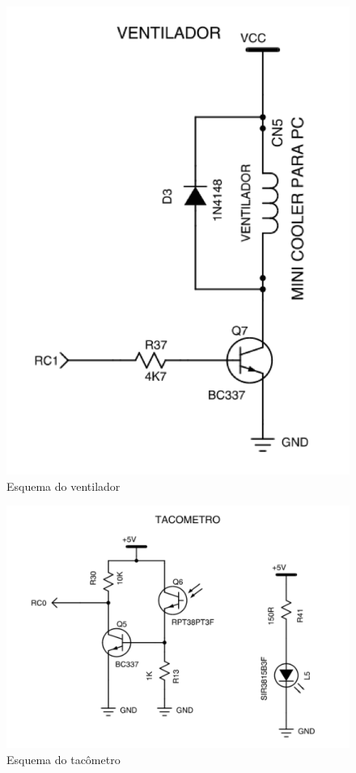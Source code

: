 \documentclass{article}
\begin{document}
\begin{figure}[H]
	\centering
	\includegraphics[width=0.5\linewidth]{esq_cooler}
	\caption{Esquema do ventilador}
	\label{fig:esq_cooler}
\end{figure}
\begin{figure}[H]
	\centering
	\includegraphics[width=0.9\linewidth]{esq_sensor}
	\caption{Esquema do tacômetro}
	\label{fig:esq_sensor}
\end{figure}
\end{document}
